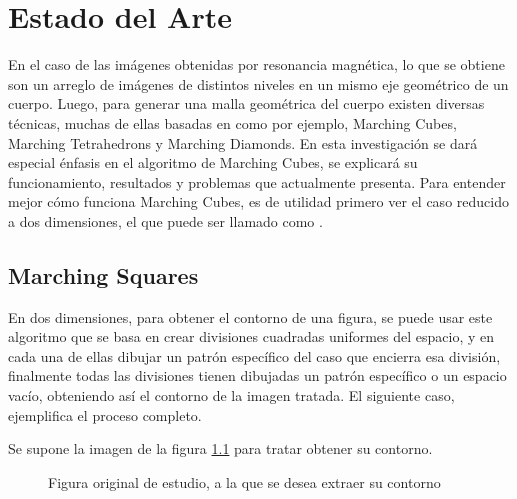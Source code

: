 \chapter{Estado del Arte}
\label{ch:estadoDelArte}

En el caso de las imágenes obtenidas por resonancia magnética, lo que se obtiene son un
arreglo de imágenes de distintos niveles en un mismo eje geométrico de un cuerpo. Luego, para
generar una malla geométrica del cuerpo existen diversas técnicas, muchas de ellas basadas en
 como por ejemplo, Marching Cubes\cite{Lorensen87marchingcubes}, Marching Tetrahedrons\cite{Shirley90apolygonal} y Marching Diamonds.
En esta investigación se dará especial énfasis en el algoritmo de Marching Cubes, se
explicará su funcionamiento, resultados y problemas que actualmente presenta.
Para entender mejor cómo funciona Marching Cubes, es de utilidad primero ver el caso
reducido a dos dimensiones, el que puede ser llamado como .

\section{Marching Squares}
\label{sec:marchingSquares}

En dos dimensiones, para obtener el contorno de una figura, se puede usar este algoritmo
que se basa en crear divisiones cuadradas uniformes del espacio, y en cada una de ellas dibujar un
patrón específico del caso que encierra esa división, finalmente todas las divisiones tienen
dibujadas un patrón específico o un espacio vacío, obteniendo así el contorno de la imagen
tratada. El siguiente caso, ejemplifica el proceso completo.

Se supone la imagen de la figura \ref{f:estadoDelArte:original} para tratar obtener su contorno.

\begin{figure}
	\centering
	\caption{Figura original de estudio, a la que se desea extraer su contorno}
	\label{f:estadoDelArte:original}
\end{figure}

